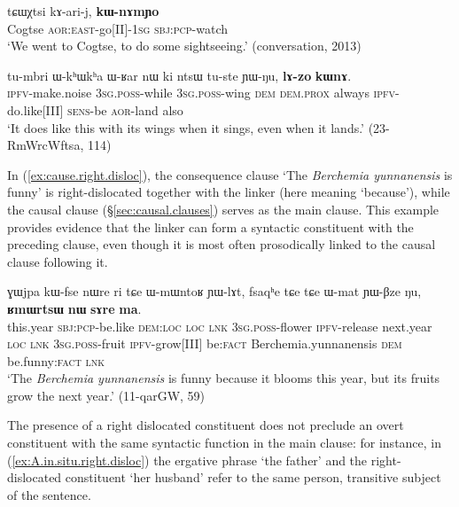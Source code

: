 \begin{exe}
\ex \label{ex:purposive.right.disloc}
\gll tɕɯχtsi kɤ-ari-j, \textbf{kɯ-nɤmɲo} \\
Cogtse \textsc{aor}:\textsc{east}-go[II]-\textsc{1sg} \textsc{sbj}:\textsc{pcp}-watch \\
\glt `We went to Cogtse, to do some sightseeing.' (conversation, 2013)
\end{exe}

\begin{exe}
\ex \label{ex:concessive.cond.right.disloc}
\gll tu-mbri ɯ-kʰɯkʰa ɯ-ʁar nɯ ki ntsɯ tu-ste ɲɯ-ŋu, \textbf{lɤ-zo} \textbf{kɯnɤ}. \\
\textsc{ipfv}-make.noise \textsc{3sg}.\textsc{poss}-while \textsc{3sg}.\textsc{poss}-wing \textsc{dem} \textsc{dem}.\textsc{prox} always \textsc{ipfv}-do.like[III] \textsc{sens}-be \textsc{aor}-land also \\
\glt `It does like this with its wings when it sings, even when it lands.' (23-RmWrcWftsa, 114)
\end{exe}

In (\ref{ex:cause.right.disloc}), the consequence clause  `The \textit{Berchemia yunnanensis} is funny' is right-dislocated together with the linker  (here meaning `because'), while the causal clause (§\ref{sec:causal.clauses}) serves as the main clause. This example provides evidence that the linker  can form a syntactic constituent with the preceding clause, even though it is most often prosodically linked to the causal clause following it.

\begin{exe}
\ex \label{ex:cause.right.disloc}
\gll ɣɯjpa kɯ-fse nɯre ri tɕe ɯ-mɯntoʁ ɲɯ-lɤt, fsaqʰe tɕe tɕe ɯ-mat ɲɯ-βze ŋu, \textbf{ʁmɯrtsɯ} \textbf{nɯ} \textbf{sɤre} \textbf{ma}. \\
this.year \textsc{sbj}:\textsc{pcp}-be.like \textsc{dem}:\textsc{loc} \textsc{loc} \textsc{lnk} \textsc{3sg}.\textsc{poss}-flower \textsc{ipfv}-release next.year \textsc{loc} \textsc{lnk} \textsc{3sg}.\textsc{poss}-fruit \textsc{ipfv}-grow[III] be:\textsc{fact} Berchemia.yunnanensis \textsc{dem} be.funny:\textsc{fact} \textsc{lnk} \\
\glt `The \textit{Berchemia yunnanensis} is funny because it blooms this year, but its fruits grow the next year.' (11-qarGW, 59)
\end{exe}

The presence of a right dislocated constituent does not preclude an overt constituent with the same syntactic function in the main clause: for instance, in (\ref{ex:A.in.situ.right.disloc}) the ergative phrase `the father' and the right-dislocated constituent  `her husband' refer to the same person, transitive subject of the sentence.

